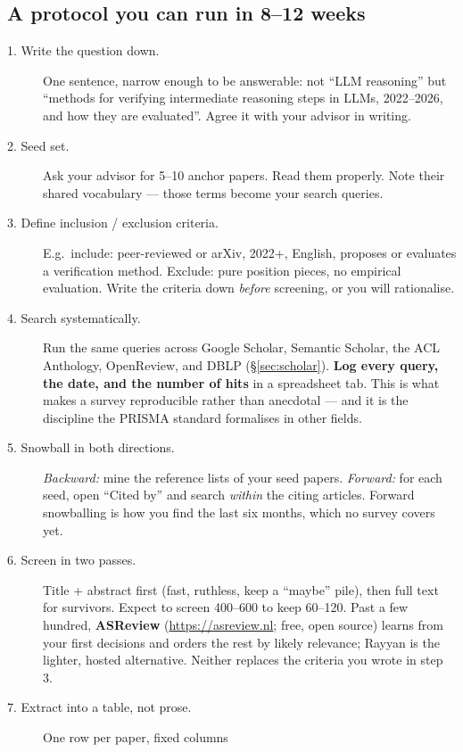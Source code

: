 \documentclass[11pt,a4paper]{article}
\begin{document}
\subsection{A protocol you can run in 8--12 weeks}

\begin{description}
  \item[1. Write the question down.] One sentence, narrow enough to be
        answerable: not ``LLM reasoning'' but ``methods for verifying
        intermediate reasoning steps in LLMs, 2022--2026, and how they are
        evaluated''. Agree it with your advisor in writing.
  \item[2. Seed set.] Ask your advisor for 5--10 anchor papers. Read them
        properly. Note their shared vocabulary --- those terms become your
        search queries.
  \item[3. Define inclusion / exclusion criteria.] E.g.\ include: peer-reviewed
        or arXiv, 2022+, English, proposes or evaluates a verification method.
        Exclude: pure position pieces, no empirical evaluation. Write the
        criteria down \emph{before} screening, or you will rationalise.
  \item[4. Search systematically.] Run the same queries across Google Scholar,
        Semantic Scholar, the ACL Anthology, OpenReview, and DBLP
        (\S\ref{sec:scholar}). \textbf{Log every query, the date, and the
        number of hits} in a spreadsheet tab. This is what makes a survey
        reproducible rather than anecdotal --- and it is the discipline the
        PRISMA standard formalises in other fields.
  \item[5. Snowball in both directions.] \emph{Backward:} mine the reference
        lists of your seed papers. \emph{Forward:} for each seed, open
        ``Cited by'' and search \emph{within} the citing articles. Forward
        snowballing is how you find the last six months, which no survey
        covers yet.
  \item[6. Screen in two passes.] Title + abstract first (fast, ruthless,
        keep a ``maybe'' pile), then full text for survivors. Expect to screen
        400--600 to keep 60--120. Past a few hundred, \textbf{ASReview}
        (\url{https://asreview.nl}; free, open source) learns from your first
        decisions and orders the rest by likely relevance; Rayyan is the
        lighter, hosted alternative. Neither replaces the criteria you wrote
        in step 3.
  \item[7. Extract into a table, not prose.] One row per paper, fixed columns

\end{description}
\end{document}
